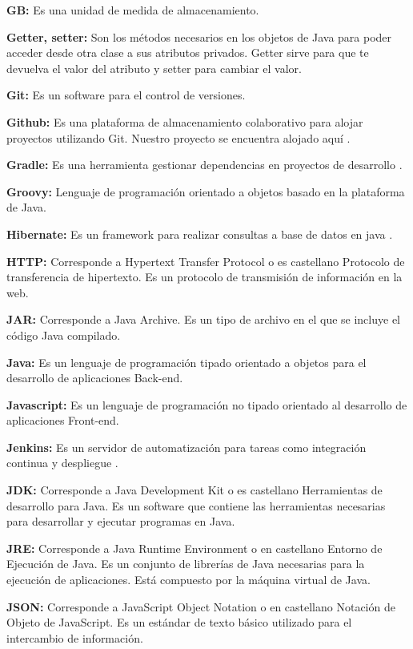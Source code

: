 \documentclass[12pt]{report} %
\begin{document}
\textbf{GB:} Es una unidad de medida de almacenamiento.

\textbf{Getter, setter:} Son los métodos necesarios en los objetos de Java para poder acceder desde otra clase a sus atributos privados. Getter sirve para que te devuelva el valor del atributo y setter para cambiar el valor.

\textbf{Git:} Es un software para el control de versiones. 

\textbf{Github:} Es una plataforma de almacenamiento colaborativo para alojar proyectos utilizando Git. Nuestro proyecto se encuentra alojado aquí \cite{repositorio}.

\textbf{Gradle:} Es una herramienta gestionar dependencias en proyectos de desarrollo \cite{gradle}.

\textbf{Groovy:} Lenguaje de programación orientado a objetos basado en la plataforma de Java.

\textbf{Hibernate:} Es un framework para realizar consultas a base de datos en java \cite{hibernate}.

\textbf{HTTP:} Corresponde a Hypertext Transfer Protocol o es castellano Protocolo de transferencia de hipertexto. Es un protocolo de transmisión de información en la web.

\textbf{JAR:} Corresponde a Java Archive. Es un tipo de archivo en el que se incluye el código Java compilado.

\textbf{Java:} Es un lenguaje de programación tipado orientado a objetos para el desarrollo de aplicaciones Back-end.

\textbf{Javascript:} Es un lenguaje de programación no tipado orientado al desarrollo de aplicaciones Front-end.

\textbf{Jenkins:} Es un servidor de automatización para tareas como integración continua y despliegue \cite{jenkins}.

\textbf{JDK:} Corresponde a Java Development Kit o es castellano Herramientas de desarrollo para Java. Es un software que contiene las herramientas necesarias para desarrollar y ejecutar programas en Java.

\textbf{JRE:} Corresponde a Java Runtime Environment o en castellano Entorno de Ejecución de Java. Es un conjunto de librerías de Java necesarias para la ejecución de aplicaciones. Está compuesto por la máquina virtual de Java.

\textbf{JSON:} Corresponde a JavaScript Object Notation o en castellano Notación de Objeto de JavaScript. Es un estándar de texto básico utilizado para el intercambio de información.
\end{document}
